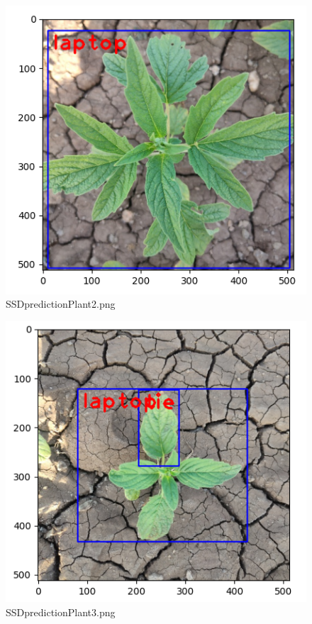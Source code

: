 \documentclass[12pt]{exam}
\begin{document}
\begin{questions}
\begin{parts}
		\begin{figure}[H]
			\includegraphics[width=\textwidth]{images-SSD/plant2.png}
			\caption{SSDpredictionPlant2.png}
		\end{figure}

		\hfill

		\begin{figure}[H]
			\includegraphics[width=\textwidth]{images-SSD/plant3.png}
			\caption{SSDpredictionPlant3.png}
		\end{figure}


\end{parts}
\end{questions}
\end{document}
